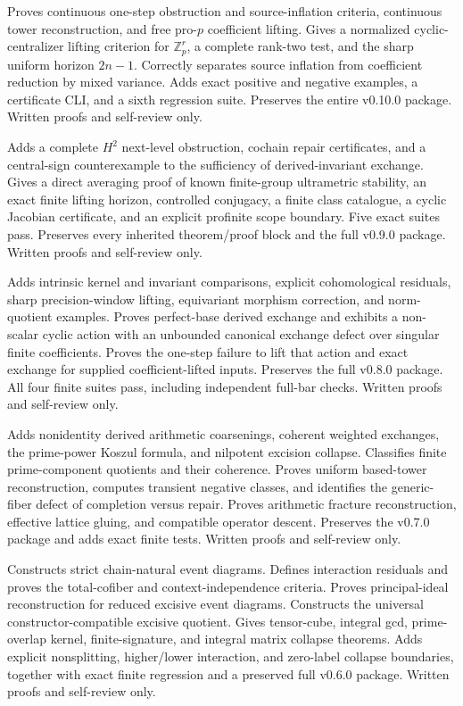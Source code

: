 \documentclass[11pt]{article}
\theoremstyle{definition}
\theoremstyle{remark}
\begin{document}
\begingroup\footnotesize\raggedright
\begin{description}[leftmargin=8em,style=nextline]
\item[v0.11.0] Proves continuous one-step obstruction and source-inflation criteria, continuous tower reconstruction, and free pro-$p$ coefficient lifting. Gives a normalized cyclic-centralizer lifting criterion for $\mathbb Z_p^r$, a complete rank-two test, and the sharp uniform horizon $2n-1$. Correctly separates source inflation from coefficient reduction by mixed variance. Adds exact positive and negative examples, a certificate CLI, and a sixth regression suite. Preserves the entire v0.10.0 package. Written proofs and self-review only.
\item[v0.10.0] Adds a complete $H^2$ next-level obstruction, cochain repair certificates, and a central-sign counterexample to the sufficiency of derived-invariant exchange. Gives a direct averaging proof of known finite-group ultrametric stability, an exact finite lifting horizon, controlled conjugacy, a finite class catalogue, a cyclic Jacobian certificate, and an explicit profinite scope boundary. Five exact suites pass. Preserves every inherited theorem/proof block and the full v0.9.0 package. Written proofs and self-review only.
\item[v0.9.0] Adds intrinsic kernel and invariant comparisons, explicit cohomological residuals, sharp precision-window lifting, equivariant morphism correction, and norm-quotient examples. Proves perfect-base derived exchange and exhibits a non-scalar cyclic action with an unbounded canonical exchange defect over singular finite coefficients. Proves the one-step failure to lift that action and exact exchange for supplied coefficient-lifted inputs. Preserves the full v0.8.0 package. All four finite suites pass, including independent full-bar checks. Written proofs and self-review only.
\item[v0.8.0] Adds nonidentity derived arithmetic coarsenings, coherent weighted exchanges, the prime-power Koszul formula, and nilpotent excision collapse. Classifies finite prime-component quotients and their coherence. Proves uniform based-tower reconstruction, computes transient negative classes, and identifies the generic-fiber defect of completion versus repair. Proves arithmetic fracture reconstruction, effective lattice gluing, and compatible operator descent. Preserves the v0.7.0 package and adds exact finite tests. Written proofs and self-review only.
\item[v0.7.0] Constructs strict chain-natural event diagrams. Defines interaction residuals and proves the total-cofiber and context-independence criteria. Proves principal-ideal reconstruction for reduced excisive event diagrams. Constructs the universal constructor-compatible excisive quotient. Gives tensor-cube, integral gcd, prime-overlap kernel, finite-signature, and integral matrix collapse theorems. Adds explicit nonsplitting, higher/lower interaction, and zero-label collapse boundaries, together with exact finite regression and a preserved full v0.6.0 package. Written proofs and self-review only.

\end{description}
\end{document}

